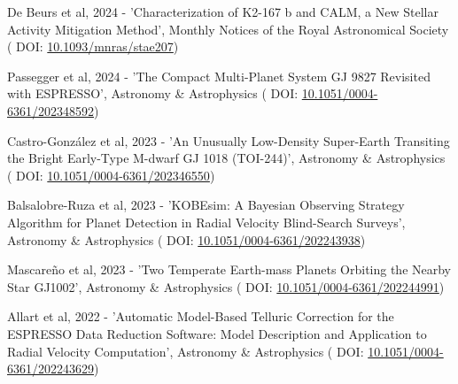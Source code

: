 \vspace*{0.3cm}

  De Beurs et al, 2024 - 'Characterization of {{K2-167}} b and {{CALM}}, a New Stellar Activity Mitigation Method', Monthly Notices of the Royal Astronomical Society ( \textcolor{MarkerColour!80!black}{\scriptsize\faLink} DOI: \href{http://dx.doi.org/10.1093/mnras/stae207}{10.1093/mnras/stae207})

\vspace*{0.3cm}

  Passegger et al, 2024 - 'The Compact Multi-Planet System {{GJ}} 9827 Revisited with {{ESPRESSO}}', Astronomy \& Astrophysics ( \textcolor{MarkerColour!80!black}{\scriptsize\faLink} DOI: \href{http://dx.doi.org/10.1051/0004-6361/202348592}{10.1051/0004-6361/202348592})

\vspace*{0.3cm}

  {Castro-Gonz{\'a}lez} et al, 2023 - 'An Unusually Low-Density Super-{{Earth}} Transiting the Bright Early-Type {{M-dwarf GJ}} 1018 ({{TOI-244}})', Astronomy \& Astrophysics ( \textcolor{MarkerColour!80!black}{\scriptsize\faLink} DOI: \href{http://dx.doi.org/10.1051/0004-6361/202346550}{10.1051/0004-6361/202346550})

\vspace*{0.3cm}

  {Balsalobre-Ruza} et al, 2023 - '{{KOBEsim}}: {{A Bayesian}} Observing Strategy Algorithm for Planet Detection in Radial Velocity Blind-Search Surveys', Astronomy \& Astrophysics ( \textcolor{MarkerColour!80!black}{\scriptsize\faLink} DOI: \href{http://dx.doi.org/10.1051/0004-6361/202243938}{10.1051/0004-6361/202243938})

\vspace*{0.3cm}

  Mascare{\~n}o et al, 2023 - 'Two Temperate {{Earth-mass}} Planets Orbiting the Nearby Star {{GJ1002}}', Astronomy \& Astrophysics ( \textcolor{MarkerColour!80!black}{\scriptsize\faLink} DOI: \href{http://dx.doi.org/10.1051/0004-6361/202244991}{10.1051/0004-6361/202244991})

\vspace*{0.3cm}

  Allart et al, 2022 - 'Automatic Model-Based Telluric Correction for the {{ESPRESSO}} Data Reduction Software: {{Model}} Description and Application to Radial Velocity Computation', Astronomy \& Astrophysics ( \textcolor{MarkerColour!80!black}{\scriptsize\faLink} DOI: \href{http://dx.doi.org/10.1051/0004-6361/202243629}{10.1051/0004-6361/202243629})

